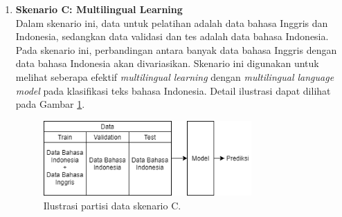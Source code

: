 \begin{enumerate}
		\item \textbf{Skenario C: Multilingual Learning}\\
		Dalam skenario ini, data untuk pelatihan adalah data bahasa Inggris dan Indonesia, sedangkan data validasi dan tes adalah data bahasa Indonesia. Pada skenario ini, perbandingan antara banyak data bahasa Inggris dengan data bahasa Indonesia akan divariasikan. Skenario ini digunakan untuk melihat seberapa efektif \textit{multilingual learning} dengan \textit{multilingual language model} pada klasifikasi teks bahasa Indonesia. Detail ilustrasi dapat dilihat pada Gambar \ref{fig:data_tipe_c}.
		\begin{figure}[h]
		    \centering
		    \includegraphics[width=0.75\textwidth]{resources/Data-tipe-C.png}
		    \caption{Ilustrasi partisi data skenario C.}
		    \label{fig:data_tipe_c}
		\end{figure}
		
	\end{enumerate}


	